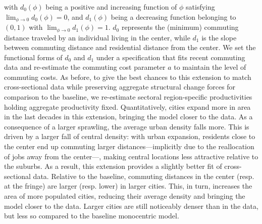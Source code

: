 \documentclass[./20250130-paper.tex]{subfiles}
\begin{document}
with $d_0(\phi)$ being a positive and increasing function of $\phi$ satisfying $\lim_{\phi \rightarrow 0} d_0(\phi)=0$, and $d_1(\phi)$ being a decreasing function belonging to $(0,1)$ with $\lim_{\phi \rightarrow 0} d_1(\phi)=1$. $d_0$ represents the (minimum) commuting distance traveled by an individual living in the center, while $d_1$ is the slope between commuting distance and residential distance from the center. We set the functional forms of $d_0$ and $d_1$ under a specification that fits recent commuting data and re-estimate the commuting cost parameter $a$ to maintain the level of commuting costs. As before, to give the best chances to this extension to match cross-sectional data while preserving aggregate structural change forces for comparison to the baseline, we re-estimate sectoral region-specific productivities holding aggregate productivity fixed. Quantitatively, cities expand more in area in the last decades in this extension, bringing the model closer to the data. As a consequence of a larger sprawling, the average urban density falls more. This is driven by a larger fall of central density: with urban expansion, residents close to the center end up commuting larger distances---implicitly due to the reallocation of jobs away from the center---, making central locations less attractive relative to the suburbs. As a result, this extension provides a slightly better fit of cross-sectional data. Relative to the baseline, commuting distances in the center (resp. at the fringe) are larger (resp. lower) in larger cities. This, in turn, increases the area of more populated cities, reducing their average density and bringing the model closer to the data. Larger cities are still noticeably denser than in the data, but less so compared to the baseline monocentric model.


	
\end{document}
